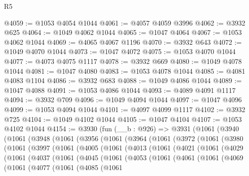 \begin{lexlean}{R5}
\begin{coremodule}
@4059 := @1053 @4054 @1044
@4061 := @4057 @4059 @3996
@4062 := @3932 @625
@4064 := @1049 @4062 @1044
@4065 := @1047 @4064
@4067 := @1053 @4062 @1044
@4069 := @4065 @4067 @1196
@4070 := @3932 @643
@4072 := @1049 @4070 @1044
@4073 := @1047 @4072
@4075 := @1053 @4070 @1044
@4077 := @4073 @4075 @1117
@4078 := @3932 @669
@4080 := @1049 @4078 @1044
@4081 := @1047 @4080
@4083 := @1053 @4078 @1044
@4085 := @4081 @4083 @1104
@4086 := @3932 @683
@4088 := @1049 @4086 @1044
@4089 := @1047 @4088
@4091 := @1053 @4086 @1044
@4093 := @4089 @4091 @1117
@4094 := @3932 @709
@4096 := @1049 @4094 @1044
@4097 := @1047 @4096
@4099 := @1053 @4094 @1044
@4101 := @4097 @4099 @1117
@4102 := @3932 @725
@4104 := @1049 @4102 @1044
@4105 := @1047 @4104
@4107 := @1053 @4102 @1044
@4154 := @3930
    (fun (__b : @926) =>
    @3931
      (@1061
        (@3940
          (@1061
            (@3948
              (@1061
                (@3956
                  (@1061
                    (@3964
                      (@1061
                        (@3972
                          (@1061
                            (@3980
                              (@1061
                                (@3997
                                  (@1061
                                    (@4005
                                      (@1061
                                        (@4013
                                          (@1061
                                            (@4021
                                              (@1061
                                                (@4029
                                                  (@1061
                                                    (@4037
                                                      (@1061
                                                        (@4045
                                                          (@1061
                                                            (@4053
                                                              (@1061
                                                                (@4061
                                                                  (@1061
                                                                    (@4069
                                                                      (@1061
                                                                        (@4077
                                                                          (@1061
                                                                            (@4085
                                                                              (@1061

\end{coremodule}
\end{lexlean}
